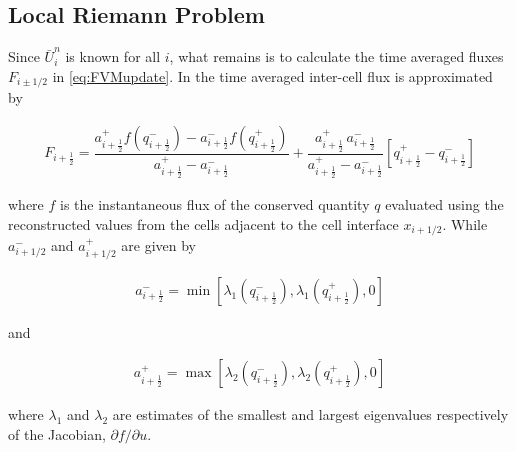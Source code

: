 \documentclass[SingleSpace,12pt,Proceedings]{Serre_ASCE}
\begin{document}
\subsection{Local Riemann Problem} %
Since $\bar{U}^{n}_i$ is known for all $i$, what remains is to calculate the time averaged fluxes $F_{i \pm 1/2}$ in \eqref{eq:FVMupdate}. In  the time averaged inter-cell flux is approximated by
\begin{linenomath*}
\begin{gather}\label{eq:HLL_flux}
F_{i+\frac{1}{2}} = \dfrac{a^+_{i+\frac{1}{2}} f\left(q^-_{i+\frac{1}{2}}\right) - a^-_{i+\frac{1}{2}} f\left(q^+_{i+\frac{1}{2}}\right)}{a^+_{i+\frac{1}{2}} - a^-_{i+\frac{1}{2}}}  + \dfrac{a^+_{i+\frac{1}{2}} \, a^-_{i+\frac{1}{2}}}{a^+_{i+\frac{1}{2}} - a^-_{i+\frac{1}{2}}} \left [ q^+_{i+\frac{1}{2}} - q^-_{i+\frac{1}{2}} \right ]
\end{gather}
\end{linenomath*}
where $f$ is the instantaneous flux of the conserved quantity $q$ evaluated using the reconstructed values from the cells adjacent to the cell interface $x_{i + 1/2}$. While $a^-_{i+1/2}$ and $a^+_{i+1/2}$ are given by
\begin{linenomath*}
\begin{gather*}
a^-_{i+\frac{1}{2}} = \min \left[\lambda_1\left(q^-_{i + \frac{1}{2}}\right), \lambda_1\left(q^+_{i + \frac{1}{2}}\right), 0 \right]
\end{gather*}
\end{linenomath*}
and
\begin{linenomath*}
\begin{gather*}
a^+_{i+\frac{1}{2}} = \max \left[\lambda_2\left(q^-_{i + \frac{1}{2}}\right), \lambda_2\left(q^+_{i + \frac{1}{2}}\right), 0 \right]
\end{gather*}
\end{linenomath*}
where $\lambda_1$ and $\lambda_2$ are estimates of the smallest and largest eigenvalues respectively of the Jacobian, $\partial f / \partial u$.
\end{document}
